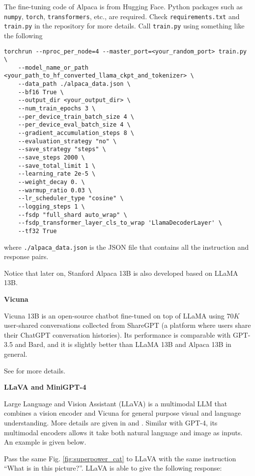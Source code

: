 The fine-tuning code of Alpaca is from Hugging Face. Python packages such as \verb|numpy|, \verb|torch|, \verb|transformers|, etc., are required. Check \verb|requirements.txt| and \verb|train.py| in the repository for more details. Call \verb|train.py| using something like the following
\begin{lstlisting}
torchrun --nproc_per_node=4 --master_port=<your_random_port> train.py \
	--model_name_or_path <your_path_to_hf_converted_llama_ckpt_and_tokenizer> \
	--data_path ./alpaca_data.json \
	--bf16 True \
	--output_dir <your_output_dir> \
	--num_train_epochs 3 \
	--per_device_train_batch_size 4 \
	--per_device_eval_batch_size 4 \
	--gradient_accumulation_steps 8 \
	--evaluation_strategy "no" \
	--save_strategy "steps" \
	--save_steps 2000 \
	--save_total_limit 1 \
	--learning_rate 2e-5 \
	--weight_decay 0. \
	--warmup_ratio 0.03 \
	--lr_scheduler_type "cosine" \
	--logging_steps 1 \
	--fsdp "full_shard auto_wrap" \
	--fsdp_transformer_layer_cls_to_wrap 'LlamaDecoderLayer' \
	--tf32 True
\end{lstlisting}
where \verb|./alpaca_data.json| is the JSON file that contains all the instruction and response pairs.

Notice that later on, Stanford Alpaca 13B is also developed based on LLaMA 13B.

\vspace{0.1in}
\noindent \textbf{Vicuna}
\vspace{0.1in}

Vicuna 13B is an open-source chatbot fine-tuned on top of LLaMA using $70K$ user-shared conversations collected from ShareGPT (a platform where users share their ChatGPT conversation histories). Its performance is comparable with GPT-3.5 and Bard, and it is slightly better than LLaMA 13B and Alpaca 13B in general.

See \cite{vicuna2023} for more details.

\vspace{0.1in}
\noindent \textbf{LLaVA and MiniGPT-4}
\vspace{0.1in}

Large Language and Vision Assistant (LLaVA) is a multimodal LLM that combines a vision encoder and Vicuna for general purpose visual and language understanding. More details are given in \cite{liu2023llava} and \cite{liu2023improvedllava}. Similar with GPT-4, its multimodal encoders allows it take both natural language and image as inputs. An example is given below.

Pass the same Fig. \ref{fig:superpower_cat} to LLaVA with the same instruction ``What is in this picture?''. LLaVA is able to give the following response:

